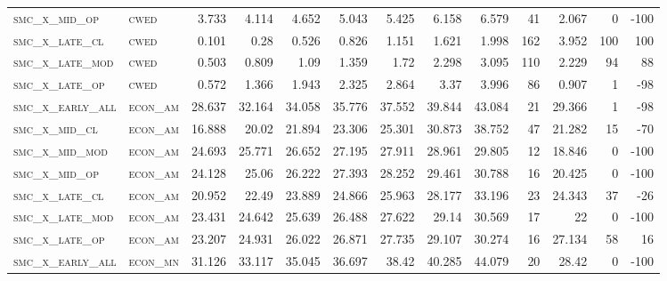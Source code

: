 \begin{landscape}
\begin{center}
\begin{footnotesize}
\begin{longtable}{llrrrrrrrr|rrr}
\textsc{smc\_x\_mid\_op   } & \textsc{cwed      }   & 3.733    & 4.114    & 4.652    & 5.043    & 5.425    & 6.158    & 6.579    & 41     & 2.067         & 0             & -100            \\
\textsc{smc\_x\_late\_cl  } & \textsc{cwed      }   & 0.101    & 0.28     & 0.526    & 0.826    & 1.151    & 1.621    & 1.998    & 162    & 3.952         & 100           & 100             \\
\textsc{smc\_x\_late\_mod } & \textsc{cwed      }   & 0.503    & 0.809    & 1.09     & 1.359    & 1.72     & 2.298    & 3.095    & 110    & 2.229         & 94            & 88              \\
\textsc{smc\_x\_late\_op  } & \textsc{cwed      }   & 0.572    & 1.366    & 1.943    & 2.325    & 2.864    & 3.37     & 3.996    & 86     & 0.907         & 1             & -98             \\
\textsc{smc\_x\_early\_all} & \textsc{econ\_am  }   & 28.637   & 32.164   & 34.058   & 35.776   & 37.552   & 39.844   & 43.084   & 21     & 29.366        & 1             & -98             \\
\textsc{smc\_x\_mid\_cl   } & \textsc{econ\_am  }   & 16.888   & 20.02    & 21.894   & 23.306   & 25.301   & 30.873   & 38.752   & 47     & 21.282        & 15            & -70             \\
\textsc{smc\_x\_mid\_mod  } & \textsc{econ\_am  }   & 24.693   & 25.771   & 26.652   & 27.195   & 27.911   & 28.961   & 29.805   & 12     & 18.846        & 0             & -100            \\
\textsc{smc\_x\_mid\_op   } & \textsc{econ\_am  }   & 24.128   & 25.06    & 26.222   & 27.393   & 28.252   & 29.461   & 30.788   & 16     & 20.425        & 0             & -100            \\
\textsc{smc\_x\_late\_cl  } & \textsc{econ\_am  }   & 20.952   & 22.49    & 23.889   & 24.866   & 25.963   & 28.177   & 33.196   & 23     & 24.343        & 37            & -26             \\
\textsc{smc\_x\_late\_mod } & \textsc{econ\_am  }   & 23.431   & 24.642   & 25.639   & 26.488   & 27.622   & 29.14    & 30.569   & 17     & 22            & 0             & -100            \\
\textsc{smc\_x\_late\_op  } & \textsc{econ\_am  }   & 23.207   & 24.931   & 26.022   & 26.871   & 27.735   & 29.107   & 30.274   & 16     & 27.134        & 58            & 16              \\
\textsc{smc\_x\_early\_all} & \textsc{econ\_mn  }   & 31.126   & 33.117   & 35.045   & 36.697   & 38.42    & 40.285   & 44.079   & 20     & 28.42         & 0             & -100            \\

\end{longtable}
\end{footnotesize}
\end{center}
\end{landscape}

